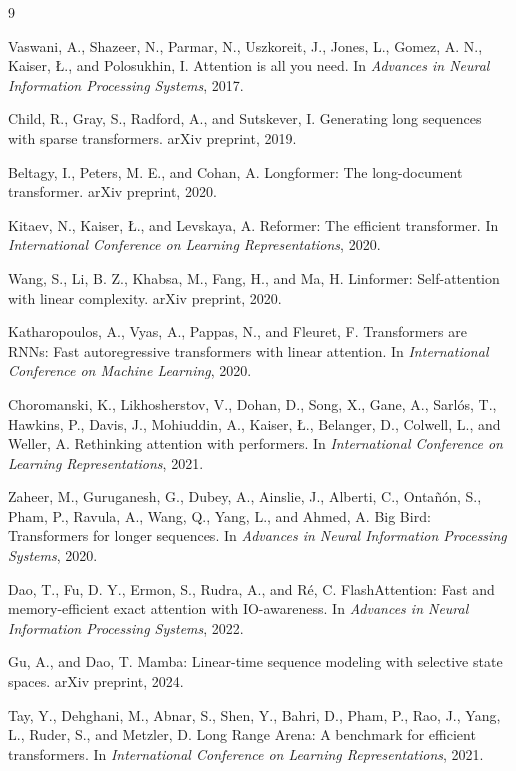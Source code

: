 \documentclass[11pt]{article}
\begin{document}
\begin{thebibliography}{9}

Vaswani, A., Shazeer, N., Parmar, N., Uszkoreit, J., Jones, L., Gomez, A. N., Kaiser, {\L}., and Polosukhin, I.
\newblock Attention is all you need.
\newblock In \emph{Advances in Neural Information Processing Systems}, 2017.

Child, R., Gray, S., Radford, A., and Sutskever, I.
\newblock Generating long sequences with sparse transformers.
\newblock arXiv preprint, 2019.

Beltagy, I., Peters, M. E., and Cohan, A.
\newblock Longformer: The long-document transformer.
\newblock arXiv preprint, 2020.

Kitaev, N., Kaiser, {\L}., and Levskaya, A.
\newblock Reformer: The efficient transformer.
\newblock In \emph{International Conference on Learning Representations}, 2020.

Wang, S., Li, B. Z., Khabsa, M., Fang, H., and Ma, H.
\newblock Linformer: Self-attention with linear complexity.
\newblock arXiv preprint, 2020.

Katharopoulos, A., Vyas, A., Pappas, N., and Fleuret, F.
\newblock Transformers are RNNs: Fast autoregressive transformers with linear attention.
\newblock In \emph{International Conference on Machine Learning}, 2020.

Choromanski, K., Likhosherstov, V., Dohan, D., Song, X., Gane, A., Sarl{\'o}s, T., Hawkins, P., Davis, J., Mohiuddin, A., Kaiser, {\L}., Belanger, D., Colwell, L., and Weller, A.
\newblock Rethinking attention with performers.
\newblock In \emph{International Conference on Learning Representations}, 2021.

Zaheer, M., Guruganesh, G., Dubey, A., Ainslie, J., Alberti, C., Onta{\~n}{\'o}n, S., Pham, P., Ravula, A., Wang, Q., Yang, L., and Ahmed, A.
\newblock Big Bird: Transformers for longer sequences.
\newblock In \emph{Advances in Neural Information Processing Systems}, 2020.

Dao, T., Fu, D. Y., Ermon, S., Rudra, A., and R{\'e}, C.
\newblock FlashAttention: Fast and memory-efficient exact attention with IO-awareness.
\newblock In \emph{Advances in Neural Information Processing Systems}, 2022.

Gu, A., and Dao, T.
\newblock Mamba: Linear-time sequence modeling with selective state spaces.
\newblock arXiv preprint, 2024.

Tay, Y., Dehghani, M., Abnar, S., Shen, Y., Bahri, D., Pham, P., Rao, J., Yang, L., Ruder, S., and Metzler, D.
\newblock Long Range Arena: A benchmark for efficient transformers.
\newblock In \emph{International Conference on Learning Representations}, 2021.

\end{thebibliography}
\end{document}
